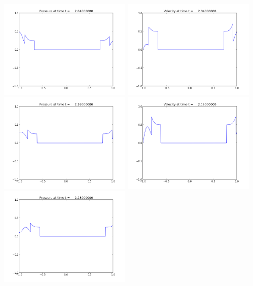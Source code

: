 \documentclass[11pt]{article}
\begin{document}
\vskip 10pt 
\includegraphics[width=0.475\textwidth]{frame0017fig1.png}
\includegraphics[width=0.475\textwidth]{frame0017fig2.png}
\vskip 10pt 
\includegraphics[width=0.475\textwidth]{frame0018fig1.png}
\includegraphics[width=0.475\textwidth]{frame0018fig2.png}
\vskip 10pt 
\includegraphics[width=0.475\textwidth]{frame0019fig1.png}
\end{document}

